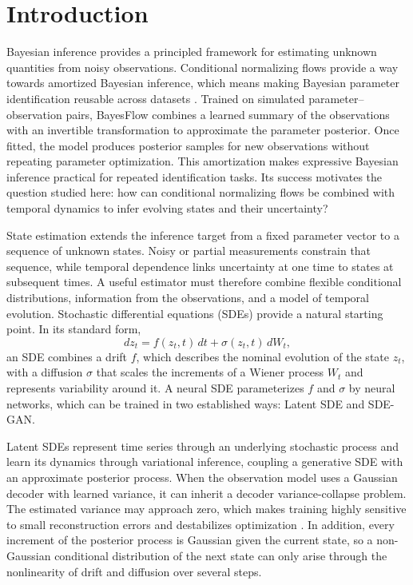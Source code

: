 \section{Introduction}\label{sec:introduction}
Bayesian inference provides a principled framework for estimating unknown quantities from noisy observations. Conditional normalizing flows provide a way towards amortized Bayesian inference, which means making Bayesian parameter identification reusable across datasets \citep{radev2021amortized}. Trained on simulated parameter--observation pairs, BayesFlow \citep{radev2020bayesflow} combines a learned summary of the observations with an invertible transformation to approximate the parameter posterior. Once fitted, the model produces posterior samples for new observations without repeating parameter optimization. This amortization makes expressive Bayesian inference practical for repeated identification tasks. Its success motivates the question studied here: how can conditional normalizing flows be combined with temporal dynamics to infer evolving states and their uncertainty?

State estimation extends the inference target from a fixed parameter vector to a sequence of unknown states. Noisy or partial measurements constrain that sequence, while temporal dependence links uncertainty at one time to states at subsequent times. A useful estimator must therefore combine flexible conditional distributions, information from the observations, and a model of temporal evolution. Stochastic differential equations (SDEs) provide a natural starting point. In its standard form,
\begin{equation}\label{eq:sde-standard}
 dz_t=f(z_t,t)\,dt+\sigma(z_t,t)\,dW_t,
\end{equation}
an SDE combines a drift $f$, which describes the nominal evolution of the state $z_t$, with a diffusion $\sigma$ that scales the increments of a Wiener process $W_t$ and represents variability around it. A neural SDE parameterizes $f$ and $\sigma$ by neural networks, which can be trained in two established ways: Latent SDE and SDE-GAN.

Latent SDEs \citep{li2020scalable} represent time series through an underlying stochastic process and learn its dynamics through variational inference, coupling a generative SDE with an approximate posterior process. When the observation model uses a Gaussian decoder with learned variance, it can inherit a decoder variance-collapse problem. The estimated variance may approach zero, which makes training highly sensitive to small reconstruction errors and destabilizes optimization \citep{takahashi2018student,rybkin2021calibrated}. In addition, every increment of the posterior process is Gaussian given the current state, so a non-Gaussian conditional distribution of the next state can only arise through the nonlinearity of drift and diffusion over several steps.

